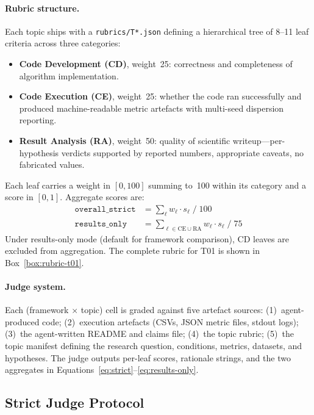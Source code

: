 \documentclass{llmxive}
\begin{document}
\paragraph{Rubric structure.}
Each topic ships with a \texttt{rubrics/T*.json} defining a hierarchical tree of 8--11 leaf criteria across three categories:
\begin{itemize}[nosep,leftmargin=*]
\item \textbf{Code Development (CD)}, weight~25: correctness and completeness of algorithm implementation.
\item \textbf{Code Execution (CE)}, weight~25: whether the code ran successfully and produced machine-readable metric artefacts with multi-seed dispersion reporting.
\item \textbf{Result Analysis (RA)}, weight~50: quality of scientific writeup---per-hypothesis verdicts supported by reported numbers, appropriate caveats, no fabricated values.
\end{itemize}
Each leaf carries a weight in $[0,100]$ summing to~100 within its category and a score in $[0,1]$.
Aggregate scores are:
\begin{align}
\texttt{overall\_strict} &= \textstyle\sum_{\ell} w_\ell \cdot s_\ell \;/\; 100 \label{eq:strict} \\
\texttt{results\_only}   &= \textstyle\sum_{\ell \in \text{CE} \cup \text{RA}} w_\ell \cdot s_\ell \;/\; 75 \label{eq:results-only}
\end{align}
Under results-only mode (default for framework comparison), CD leaves are excluded from aggregation.
The complete rubric for T01 is shown in Box~\ref{box:rubric-t01}.

\paragraph{Judge system.}
Each (framework $\times$ topic) cell is graded against five artefact sources:
(1)~agent-produced code; (2)~execution artefacts (CSVs, JSON metric files, stdout logs); (3)~the agent-written README and claims file; (4)~the topic rubric; (5)~the topic manifest defining the research question, conditions, metrics, datasets, and hypotheses.
The judge outputs per-leaf scores, rationale strings, and the two aggregates in Equations~\ref{eq:strict}--\ref{eq:results-only}.

\subsection{Strict Judge Protocol}
\label{app:strict-judge}
\end{document}
